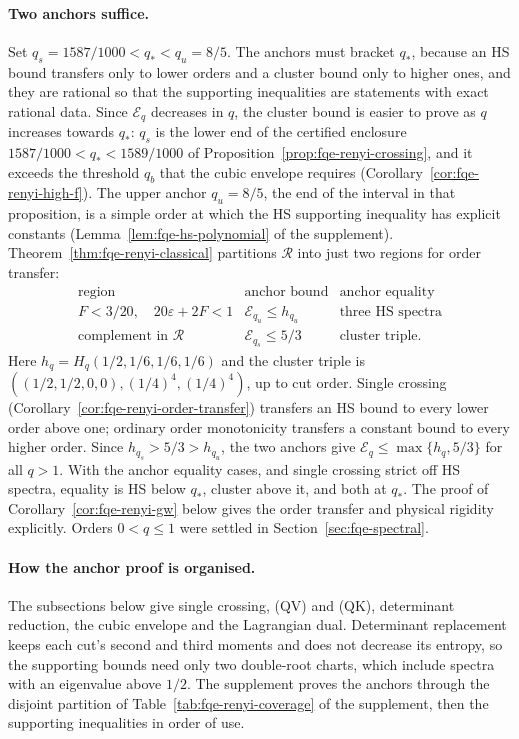 \paragraph{Two anchors suffice.}
Set $q_s=1587/1000<q_*<q_u=8/5$. The anchors must bracket $q_*$, because an HS bound transfers only to lower orders
and a cluster bound only to higher ones, and they are rational so that the supporting inequalities are statements
with exact rational data. Since $\mathcal E_q$ decreases in $q$, the cluster bound is easier to prove as $q$ increases towards $q_*$: $q_s$ is the
lower end of the certified enclosure $1587/1000<q_*<1589/1000$ of Proposition~\ref{prop:fqe-renyi-crossing}, and it
exceeds the threshold $q_b$ that the cubic envelope requires
(Corollary~\ref{cor:fqe-renyi-high-f}). The upper anchor $q_u=8/5$, the end of the interval in
that proposition, is a simple order at which the HS supporting inequality has explicit constants
(Lemma~\ref{lem:fqe-hs-polynomial} of the supplement). Theorem~\ref{thm:fqe-renyi-classical}
partitions $\mathcal R$ into just two regions for order transfer:
\[
\begin{array}{c|c|c}
\text{region}&\text{anchor bound}&\text{anchor equality}\\\hline
F<3/20,\quad20\varepsilon+2F<1
 &\mathcal E_{q_u}\le h_{q_u}&\text{three HS spectra}\\
\text{complement in }\mathcal R
 &\mathcal E_{q_s}\le5/3&\text{cluster triple}.
\end{array}
\]
Here $h_q=H_q(1/2,1/6,1/6,1/6)$ and the cluster triple is
$((1/2,1/2,0,0),(1/4)^4,(1/4)^4)$, up to cut order.
Single crossing (Corollary~\ref{cor:fqe-renyi-order-transfer}) transfers an HS
bound to every lower order above one; ordinary order monotonicity transfers
a constant bound to every higher order. Since $h_{q_s}>5/3>h_{q_u}$,
the two anchors give $\mathcal E_q\le\max\{h_q,5/3\}$ for all $q>1$.
With the anchor equality cases, and single crossing strict off HS spectra,
equality is HS below $q_*$, cluster above it, and both at $q_*$. The proof of Corollary~\ref{cor:fqe-renyi-gw} below gives
the order transfer and physical rigidity explicitly. Orders $0<q\le1$
were settled in Section~\ref{sec:fqe-spectral}.

\paragraph{How the anchor proof is organised.}
The subsections below give single crossing, (QV) and (QK), determinant reduction,
the cubic envelope and the Lagrangian dual. Determinant replacement keeps
each cut's second and third moments and does not decrease its entropy, so the
supporting bounds need only two double-root charts, which include spectra
with an eigenvalue above $1/2$. The supplement proves the anchors through the
disjoint partition of Table~\ref{tab:fqe-renyi-coverage} of the supplement, then the supporting
inequalities in order of use.

